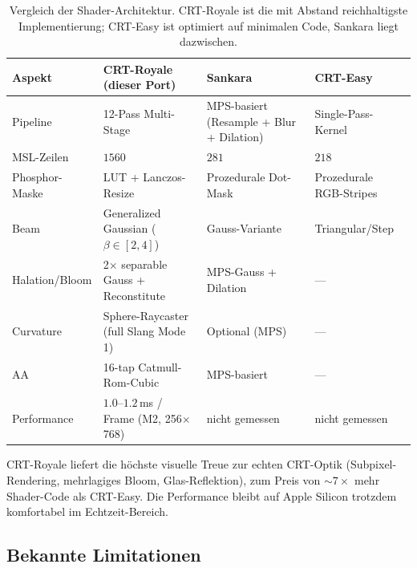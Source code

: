 \documentclass[11pt, a4paper]{article}
\newcommand{\tableheadercolor}{\rowcolor{hkared}}
\newcommand{\thw}[1]{\color{white}\textbf{#1}}  %
\begin{document}
\vspace{.25cm}
\begin{table}[H]
\centering
\small
{}
\begin{tabularx}{\textwidth}{lXXX}
    \toprule
    \tableheadercolor \thw{Aspekt} & \thw{CRT-Royale (dieser Port)} & \thw{Sankara} & \thw{CRT-Easy} \\
    \midrule
    Pipeline       & 12-Pass Multi-Stage & MPS-basiert (Resample + Blur + Dilation) & Single-Pass-Kernel \\
    MSL-Zeilen     & $1560$ & $281$ & $218$ \\
    Phosphor-Maske & LUT + Lanczos-Resize & Prozedurale Dot-Mask & Prozedurale RGB-Stripes \\
    Beam           & Generalized Gaussian ($\beta \in [2,4]$) & Gauss-Variante & Triangular/Step \\
    Halation/Bloom & 2$\times$ separable Gauss + Reconstitute & MPS-Gauss + Dilation & --- \\
    Curvature      & Sphere-Raycaster (full Slang Mode 1) & Optional (MPS) & --- \\
    AA             & 16-tap Catmull-Rom-Cubic & MPS-basiert & --- \\
    Performance & $1.0$--$1.2$\,ms / Frame (M2, 256$\times$768) & nicht gemessen & nicht gemessen \\
    \bottomrule
\end{tabularx}
 \vspace{.25cm}
\caption{Vergleich der Shader-Architektur. CRT-Royale ist die mit Abstand reichhaltigste Implementierung; CRT-Easy ist optimiert auf minimalen Code, Sankara liegt dazwischen.}
\end{table}

CRT-Royale liefert die h\"ochste visuelle Treue zur echten CRT-Optik (Subpixel-Rendering, mehrlagiges Bloom, Glas-Reflektion), zum Preis von $\sim 7\times$ mehr Shader-Code als CRT-Easy. Die Performance bleibt auf Apple Silicon trotzdem komfortabel im Echtzeit-Bereich.

\vspace{.5cm}
\subsection{Bekannte Limitationen}
\vspace{.25cm}
\end{document}
